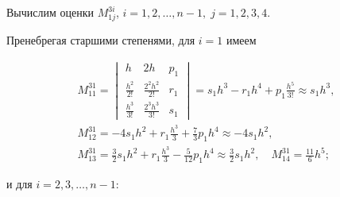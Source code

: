 Вычислим оценки $M_{1j}^{3i}$, $i=1,  2,  \dots,  n-1,\; j=1,  2,  3,  4$.

Пренебрегая старшими степенями, для $i=1$ имеем 

\begin{gather}

\label{mc:eq48}

M_{11}^{31}=

\begin{vmatrix}

      h & 2h & p_1

   \\

      \frac{h^2}{2!} &   \frac{2^2h^2}{2!} & r_1

   \\

      \frac{h^3}{3!} &   \frac{2^3h^3}{3!} & s_1

 \end{vmatrix}


   =s_1h^3-r_1h^4+p_1\frac{h^5}{3!}\approx s_1h^3,

\\

\label{mc:eq50}  

M_{12}^{31}=

 -4s_1h^2+r_1\frac{h^3}{3}+\frac{7}{3}p_1h^4\approx -4s_1h^2,

\\

\label{mc:eq50}  

M_{13}^{31}=

 \frac{3}{2}s_1h^2+r_1\frac{h^3}{3}-\frac{5}{12}p_1h^4\approx \frac{3}{2}s_1h^2, \quad 

 M_{14}^{31}=\frac{11}{6}h^5;

\end{gather}





и для $i=2,  3,  \dots,  n-1$:

